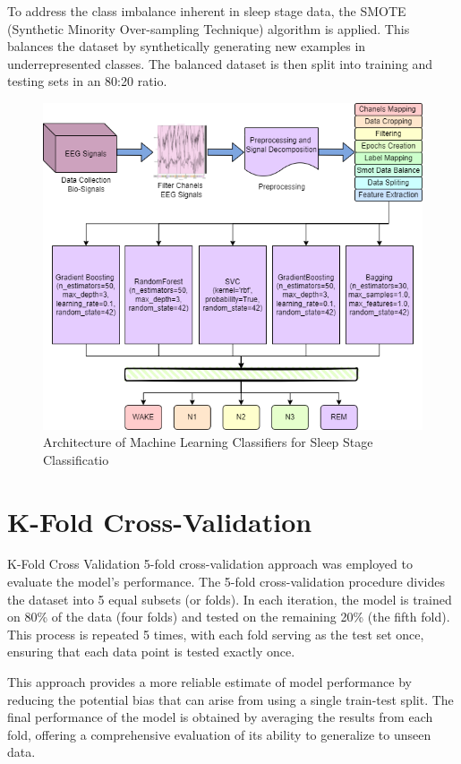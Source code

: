 To address the class imbalance inherent in sleep stage data, the SMOTE (Synthetic Minority Over-sampling Technique) algorithm is applied. This balances the dataset by synthetically generating new examples in underrepresented classes. The balanced dataset is then split into training and testing sets in an 80:20 ratio.  

\begin{figure}
	\centering
	\includegraphics[width=0.9\linewidth]{"img/paper_1/Architechture1"}
	\caption{Architecture of Machine Learning Classifiers for Sleep Stage
		Classificatio}
	\label{fig:architechture1}
\end{figure}



\section{K-Fold Cross-Validation}

K-Fold Cross Validation  5-fold cross-validation approach was employed to evaluate the model's performance. The 5-fold cross-validation procedure divides the dataset into 5 equal subsets (or folds). In each iteration, the model is trained on 80\% of the data (four folds) and tested on the remaining 20\% (the fifth fold). This process is repeated 5 times, with each fold serving as the test set once, ensuring that each data point is tested exactly once.

This approach provides a more reliable estimate of model performance by reducing the potential bias that can arise from using a single train-test split. The final performance of the model is obtained by averaging the results from each fold, offering a comprehensive evaluation of its ability to generalize to unseen data.

